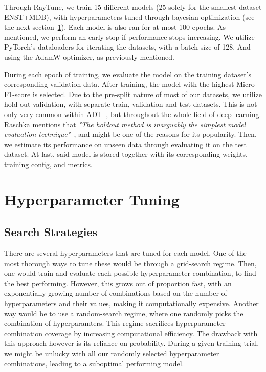 Through RayTune, we train 15 different models (25 solely for the smallest dataset ENST+MDB), with hyperparameters tuned through bayesian optimization (see the next section~\ref{HyperparameterTuning}). Each model is also ran for at most 100 epochs. As mentioned, we perform an early stop if performance stops increasing. We utilize PyTorch's dataloaders for iterating the datasets, with a batch size of 128. And using the AdamW optimizer, as previously mentioned.

During each epoch of training, we evaluate the model on the training dataset's corresponding validation data. After training, the model with the highest Micro F1-score is selected. Due to the pre-split nature of most of our datasets, we utilize hold-out validation, with separate train, validation and test datasets. This is not only very common within \gls{ADT}~\cite{inproceedings, 8350302, chang2024yourmt3multiinstrumentmusictranscription}, but throughout the whole field of deep learning. Raschka mentions that \textit{"The holdout method is inarguably the simplest model evaluation technique"}~\cite{raschka2020modelevaluationmodelselection}, and might be one of the reasons for its popularity.
Then, we estimate its performance on unseen data through evaluating it on the test dataset. At last, said model is stored together with its corresponding weights, training config, and metrics.

\section{Hyperparameter Tuning}\label{HyperparameterTuning}

\subsection{Search Strategies}

There are several hyperparameters that are tuned for each model. One of the most thorough ways to tune these would be through a grid-search regime. Then, one would train and evaluate each possible hyperparameter combination, to find the best performing. However, this grows out of proportion fast, with an exponentially growing number of combinations based on the number of hyperparameters and their values, making it computationally expensive. Another way would be to use a random-search regime, where one randomly picks the combination of hyperparamters. This regime sacrifices hyperparameter combination coverage by increasing computational efficiency. The drawback with this approach however is its reliance on probability. During a given training trial, we might be unlucky with all our randomly selected hyperparameter combinations, leading to a suboptimal performing model.

